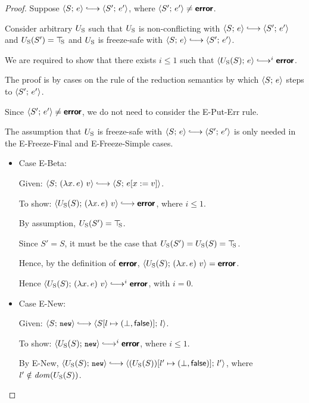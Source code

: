 \begin{proof}
  Suppose $\config{S}{e} \parstepsto \config{S'}{e'}$, where
  $\langle S';\, e' \rangle \neq \textbf{\textsf{error}}$.

  Consider arbitrary $U_{\mathrm{S}}$ such that $U_{\mathrm{S}}$ is non-conflicting with
  $\config{S}{e} \parstepsto \config{S'}{e'}$ and $U_{\mathrm{S}}(S') = \top\hspace{-0.85mm}_{\mathrm{S}}$
  and $U_{\mathrm{S}}$ is freeze-safe with $\config{S}{e} \parstepsto
  \config{S'}{e'}$.

  We are required to show that there exists $i \leq 1$ such that
  $\config{\Ustore(S)}{e} \parstepsto^i \error$.

  The proof is by cases on the rule of the reduction semantics by
  which $\langle S;\, e \rangle$ steps to $\langle S';\, e' \rangle$.

  Since $\langle S';\, e' \rangle \neq \textbf{\textsf{error}}$, we do not need to consider the
  {\sc E-Put-Err} rule.

  The assumption that $U_{\mathrm{S}}$ is freeze-safe with $\config{S}{e}
  \parstepsto \config{S'}{e'}$ is only needed in the {\sc
    E-Freeze-Final} and {\sc E-Freeze-Simple} cases.

  \begin{itemize}

  \item Case {\sc E-Beta}:

    Given: $\config{S}{\app{(\lam{x}{e})}{v}} \parstepsto
    \config{S}{\subst{e}{x}{v}}$.

    To show: $\config{\Ustore(S)}{\app{(\lam{x}{e})}{v}} \parstepsto
    \error$, where $i \leq 1$.

    By assumption, $U_{\mathrm{S}}(S') = \top\hspace{-0.85mm}_{\mathrm{S}}$.

    Since $S' = S$, it must be the case that $U_{\mathrm{S}}(S') = U_{\mathrm{S}}(S) =
    \top\hspace{-0.85mm}_{\mathrm{S}}$.

    Hence, by the definition of $\textbf{\textsf{error}}$,
    $\langle U_{\mathrm{S}}(S);\, (\lambda x.\,e)~v \rangle = \textbf{\textsf{error}}$.

    Hence $\config{\Ustore(S)}{\app{(\lam{x}{e})}{v}} \parstepsto^i
    \error$, with $i = 0$.

  \item Case {\sc E-New}:

    Given: $\config{S}{\NEW} \parstepsto
    \config{\extS{S}{l}{\bot}{\frozenfalse}}{l}$.

    To show: $\config{\Ustore(S)}{\NEW} \parstepsto^i \error$, where $i
    \leq 1$.

    By {\sc E-New}, $\config{\Ustore(S)}{\NEW} \parstepsto
    \config{\extS{(\Ustore(S))}{l'}{\bot}{\frozenfalse}}{l'}$, where $l'
    \notin \mathit{dom}(U_{\mathrm{S}}(S))$.


\end{itemize}
\end{proof}
